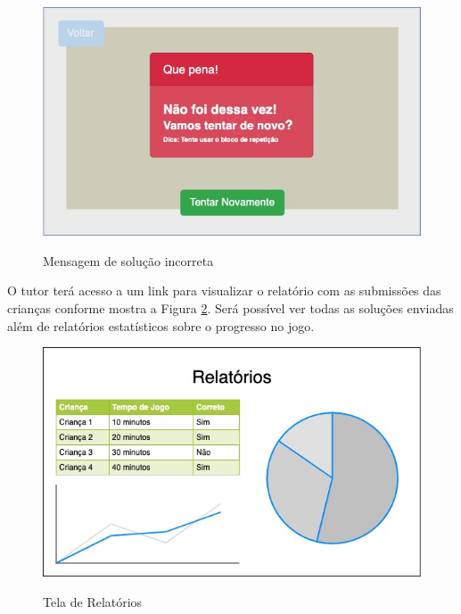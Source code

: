     \begin{figure}[H]
        \caption{Mensagem de solução incorreta}
        \centering
        \includegraphics[width=\linewidth]{Imagens/Cap3/solucao_incorreta.jpg}
        \label{figura:solucao_incorreta}
    \end{figure}
    
    O tutor terá acesso a um link para visualizar o relatório com as submissões das crianças conforme mostra a Figura \ref{figura:tela_relatorios}. Será possível ver todas as soluções enviadas além de relatórios estatísticos sobre o progresso no jogo.
    
    \begin{figure}[H]
        \caption{Tela de Relatórios}
        \centering
        \includegraphics[width=\linewidth]{Imagens/Cap3/Tela Relatorios.jpg}
        \label{figura:tela_relatorios}
    \end{figure}
    
